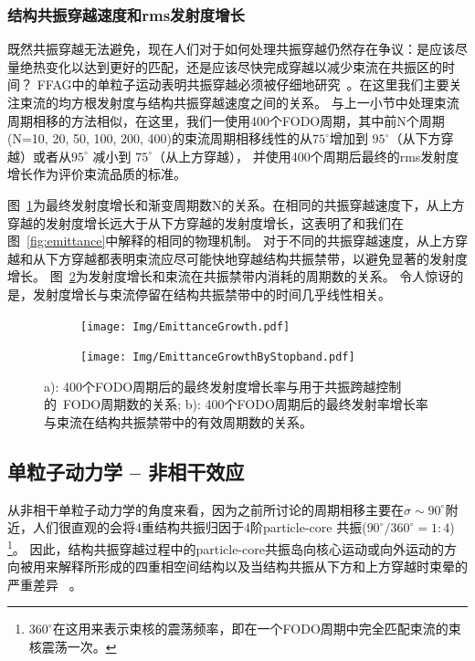 \subsubsection{结构共振穿越速度和rms发射度增长}
既然共振穿越无法避免，现在人们对于如何处理共振穿越仍然存在争议：是应该尽量绝热变化以达到更好的匹配，还是应该尽快完成穿越以减少束流在共振区的时间？
FFAG中的单粒子运动表明共振穿越必须被仔细地研究~\cite{26}。在这里我们主要关注束流的均方根发射度与结构共振穿越速度之间的关系。
与上一小节中处理束流周期相移的方法相似，在这里，我们一使用400个FODO周期，其中前N个周期(N=10, 20, 50, 100, 200, 400)的束流周期相移线性的从$75^\circ$增加到  $95^\circ$（从下方穿越）或者从$95^\circ$ 减小到 $75^\circ$（从上方穿越），
并使用400个周期后最终的rms发射度增长作为评价束流品质的标准。

图~\ref{sfig:CrossingSpeed_byStopband1}为最终发射度增长和渐变周期数N的关系。在相同的共振穿越速度下，从上方穿越的发射度增长远大于从下方穿越的发射度增长，这表明了和我们在图~\ref{fig:emittance}中解释的相同的物理机制。
对于不同的共振穿越速度，从上方穿越和从下方穿越都表明束流应尽可能快地穿越结构共振禁带，以避免显著的发射度增长。
图~\ref{sfig:CrossingSpeed_byStopband2}为发射度增长和束流在共振禁带内消耗的周期数的关系。
令人惊讶的是，发射度增长与束流停留在结构共振禁带中的时间几乎线性相关。

\begin{figure}[thbp]
    \centering
    \begin{subfigure}[b]{0.48\textwidth}
        \texttt{[image: Img/EmittanceGrowth.pdf]}
        \caption{}
        \label{sfig:CrossingSpeed_byStopband1}
    \end{subfigure}
    \begin{subfigure}[b]{0.48\textwidth}
        \texttt{[image: Img/EmittanceGrowthByStopband.pdf]}
        \caption{}
        \label{sfig:CrossingSpeed_byStopband2}
    \end{subfigure}
    \caption{
    a): 400个FODO周期后的最终发射度增长率与用于共振跨越控制的~FODO周期数的关系;
    b): 400个FODO周期后的最终发射率增长率与束流在结构共振禁带中的有效周期数的关系。}
    \label{fig:CrossingSpeed}
\end{figure}

\subsection{单粒子动力学 -- 非相干效应}
\label{section:Crossing_Incoherent}
从非相干单粒子动力学的角度来看，因为之前所讨论的周期相移主要在$\sigma\sim90^\circ$附近，人们很直观的会将4重结构共振归因于4阶particle-core 共振($90^\circ/360^\circ=1:4$)
\footnote{$360^\circ$在这用来表示束核的震荡频率，即在一个FODO周期中完全匹配束流的束核震荡一次。}。
因此，结构共振穿越过程中的particle-core共振岛向核心运动或向外运动的方向被用来解释所形成的四重相空间结构以及当结构共振从下方和上方穿越时束晕的严重差异~\cite{25} 。

